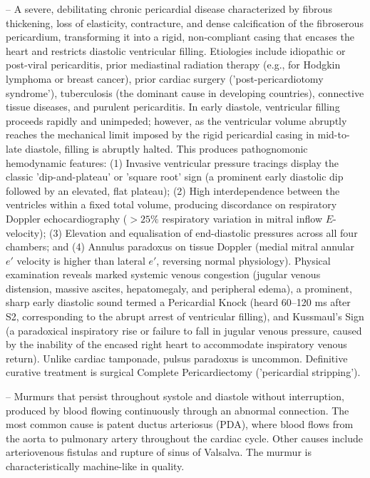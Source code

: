-- A severe, debilitating chronic pericardial disease characterized by fibrous thickening, loss of elasticity, contracture, and dense calcification of the fibroserous pericardium, transforming it into a rigid, non-compliant casing that encases the heart and restricts diastolic ventricular filling. Etiologies include idiopathic or post-viral pericarditis, prior mediastinal radiation therapy (e.g., for Hodgkin lymphoma or breast cancer), prior cardiac surgery ('post-pericardiotomy syndrome'), tuberculosis (the dominant cause in developing countries), connective tissue diseases, and purulent pericarditis. In early diastole, ventricular filling proceeds rapidly and unimpeded; however, as the ventricular volume abruptly reaches the mechanical limit imposed by the rigid pericardial casing in mid-to-late diastole, filling is abruptly halted. This produces pathognomonic hemodynamic features: (1) Invasive ventricular pressure tracings display the classic 'dip-and-plateau' or 'square root' sign (a prominent early diastolic dip followed by an elevated, flat plateau); (2) High interdependence between the ventricles within a fixed total volume, producing discordance on respiratory Doppler echocardiography ($>25\%$ respiratory variation in mitral inflow $E$-velocity); (3) Elevation and equalisation of end-diastolic pressures across all four chambers; and (4) Annulus paradoxus on tissue Doppler (medial mitral annular $e'$ velocity is higher than lateral $e'$, reversing normal physiology). Physical examination reveals marked systemic venous congestion (jugular venous distension, massive ascites, hepatomegaly, and peripheral edema), a prominent, sharp early diastolic sound termed a Pericardial Knock (heard 60--120 ms after S2, corresponding to the abrupt arrest of ventricular filling), and Kussmaul's Sign (a paradoxical inspiratory rise or failure to fall in jugular venous pressure, caused by the inability of the encased right heart to accommodate inspiratory venous return). Unlike cardiac tamponade, pulsus paradoxus is uncommon. Definitive curative treatment is surgical Complete Pericardiectomy ('pericardial stripping').

-- Murmurs that persist throughout systole and diastole without interruption, produced by blood flowing continuously through an abnormal connection. The most common cause is patent ductus arteriosus (PDA), where blood flows from the aorta to pulmonary artery throughout the cardiac cycle. Other causes include arteriovenous fistulas and rupture of sinus of Valsalva. The murmur is characteristically machine-like in quality.

